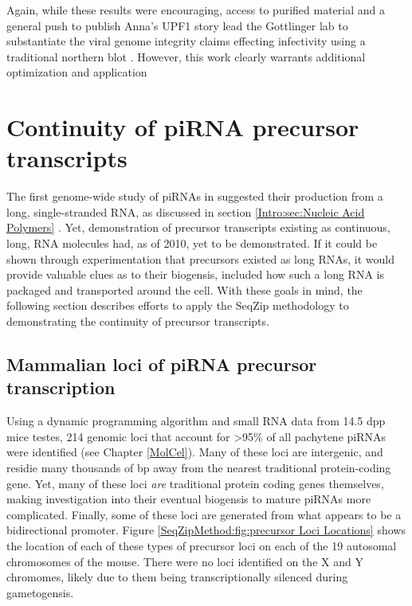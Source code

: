     Again, while these results were encouraging, access to purified material and a general push to publish Anna's UPF1 story lead the Gottlinger lab to substantiate the viral genome integrity claims effecting infectivity using a traditional northern blot \citep{Serquina2013}. However, this work clearly warrants additional optimization and application

\section{Continuity of piRNA precursor transcripts}
  \label{SeqZipMethod:sec:Demonstrating continuous precursor TX by SeqZip}

  The first genome-wide study of piRNAs in \flies{} suggested their production from a long, single-stranded RNA, as discussed in section \ref{Intro:sec:Nucleic Acid Polymers} \citep{Brennecke2007,Gunawardane2007}. Yet, demonstration of precursor transcripts existing as continuous, long, RNA molecules had, as of 2010, yet to be demonstrated. If it could be shown through experimentation that precursors existed as long RNAs, it would provide valuable clues as to their biogensis, included how such a long RNA is packaged and transported around the cell. With these goals in mind, the following section describes efforts to apply the SeqZip methodology to demonstrating the continuity of precursor transcripts.

  \subsection{Mammalian loci of piRNA precursor transcription}
    \label{SeqZipMethod:subsec:Mammalian Loci of precursor Tx}

    Using a dynamic programming algorithm and small RNA data from 14.5 dpp mice testes, 214 genomic loci that account for >95\% of all pachytene piRNAs were identified (see Chapter \ref{MolCel}). Many of these loci are intergenic, and residie many thousands of bp away from the nearest traditional protein-coding gene. Yet, many of these loci \textit{are} traditional protein coding genes themselves, making investigation into their eventual biogensis to mature piRNAs more complicated. Finally, some of these loci are generated from what appears to be a bidirectional promoter. Figure \ref{SeqZipMethod:fig:precursor Loci Locations} shows the location of each of these types of precursor loci on each of the 19 autosomal chromosomes of the mouse. There were no loci identified on the X and Y chromomes, likely due to them being transcriptionally silenced during gametogensis. 

